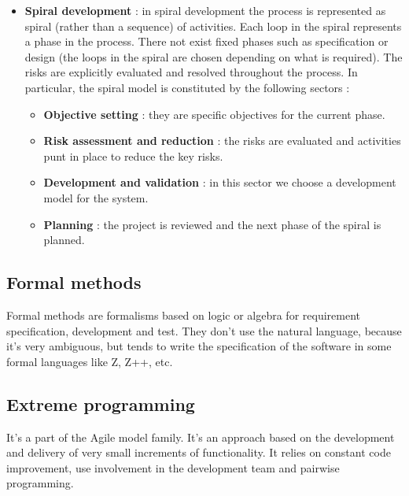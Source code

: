 \begin{itemize}
    \item \textbf{Spiral development} : in spiral development the process is represented as spiral (rather than a sequence) of activities. Each loop in the spiral represents a phase in the process. There not exist fixed phases such as specification or design (the loops in the spiral are chosen depending on what is required). The risks are explicitly evaluated and resolved throughout the process. In particular, the spiral model is constituted by the following sectors :
          \begin{itemize}
              \item \textbf{Objective setting} : they are specific objectives for the current phase.
              \item \textbf{Risk assessment and reduction} : the risks are evaluated and activities punt in place to reduce the key risks.
              \item \textbf{Development and validation} : in this sector we choose a development model for the system.
              \item \textbf{Planning} : the project is reviewed and the next phase of the spiral is planned.
          \end{itemize}
\end{itemize}
\subsection{Formal methods}
Formal methods are formalisms based on logic or algebra for requirement specification, development and test. They don't use the natural language, because it's very ambiguous, but tends to write the specification of the software in some formal languages like Z, Z++, etc.
\subsection{Extreme programming}
It's a part of the Agile model family. It's an approach based on the development and delivery of very small increments of functionality. It relies on constant code improvement, use involvement in the development team and pairwise programming.
